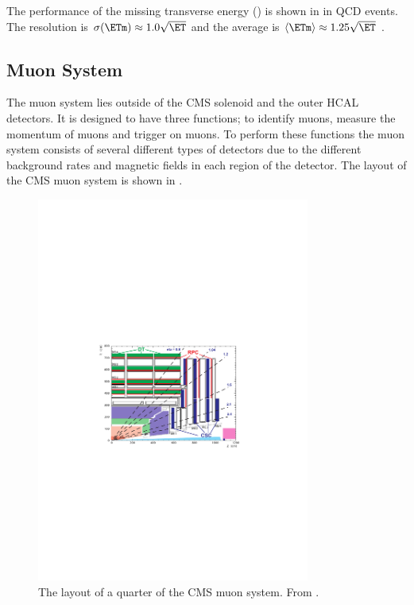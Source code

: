 The performance of the missing transverse energy (\ETm) is shown in
 in QCD events. The \ETm resolution is
$\sigma(\ETm) \approx 1.0 \sqrt \ET$ and the average \ETm is 
$\langle \ETm \rangle \approx 1.25 \sqrt \ET$ \cite{chatrchyan2008cms}.

\subsection{Muon System}
The muon system lies outside of the CMS solenoid and the outer HCAL detectors.
It is designed to have three functions; to identify muons, measure the momentum
of muons and trigger on muons. To perform these functions the muon system
consists of several different types of detectors due to the different background
rates and magnetic fields in each region of the detector.
The layout of the {CMS} muon system is shown in .

\begin{figure}[htbp]
  \centering
  \includegraphics[width=0.8\textwidth]{muon_system}
  \caption[The layout of a quarter of the CMS muon system.] {The layout of a
quarter of the CMS muon system. From \cite{chatrchyan2008cms}.}
  \label{fig:muon_system}
\end{figure}

